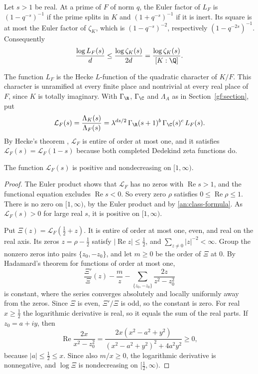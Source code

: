 Let $s>1$ be real. At a prime of $F$ of norm $q$, the Euler factor of $L_F$
is $(1-q^{-s})^{-1}$ if the prime splits in $K$ and $(1+q^{-s})^{-1}$ if it
is inert. Its square is at most the Euler factor of $\zeta_K$, which is
$(1-q^{-s})^{-2}$, respectively $(1-q^{-2s})^{-1}$. Consequently
\begin{equation}\label{an:relative-euler}
 \frac{\log L_F(s)}d\le\frac{\log\zeta_K(s)}{2d}
 =\frac{\log\zeta_K(s)}{[K:\Q]}.
\end{equation}

The function $L_F$ is the Hecke $L$-function of the quadratic character of
$K/F$. This character is unramified at every finite place and nontrivial at
every real place of $F$, since $K$ is totally imaginary. With $\Gamma_\R$,
$\Gamma_\C$ and $\Lambda_A$ as in Section~\ref{gf:section}, put
\begin{equation}\label{an:completion}
 \mathcal L_F(s)=\frac{\Lambda_K(s)}{\Lambda_F(s)}
 =\lambda^{ds/2}\,\Gamma_\R(s+1)^b\,\Gamma_\C(s)^c\,L_F(s).
\end{equation}
By Hecke's theorem \cite{Hecke1920,Tate1967}, $\mathcal L_F$ is entire of
order at most one, and it satisfies $\mathcal L_F(s)=\mathcal L_F(1-s)$
because both completed Dedekind zeta functions do.

\begin{lemma}\label{an:monotonicity}
The function $\mathcal L_F(s)$ is positive and nondecreasing on $[1,\infty)$.
\end{lemma}

\begin{proof}
The Euler product shows that $\mathcal L_F$ has no zeros with
$\operatorname{Re}s>1$, and the functional equation excludes
$\operatorname{Re}s<0$. So every zero $\rho$ satisfies $0\le\operatorname{Re}
\rho\le1$. There is no zero on $[1,\infty)$, by the Euler product and by
\eqref{an:class-formula}. As $\mathcal L_F(s)>0$ for large real $s$,
it is positive on $[1,\infty)$.

Put $\Xi(z)=\mathcal L_F(\frac12+z)$. It is entire of order at most one,
even, and real on the real axis. Its zeros $z=\rho-\frac12$ satisfy
$|\operatorname{Re}z|\le\frac12$, and $\sum_{z\ne0}|z|^{-2}<\infty$. Group
the nonzero zeros into pairs $\{z_0,-z_0\}$, and let $m\ge0$ be the order of
$\Xi$ at $0$. By Hadamard's theorem for functions of order at most one,
\[
 \frac{\Xi'}{\Xi}(z)-\frac mz-\sum_{\{z_0,-z_0\}}\frac{2z}{z^2-z_0^2}
\]
is constant, where the series converges absolutely and locally uniformly
away from the zeros. Since $\Xi$ is even, $\Xi'/\Xi$ is odd, so the constant
is zero. For real $x\ge\frac12$ the logarithmic derivative is real, so it
equals the sum of the real parts. If $z_0=a+iy$, then
\[
 \operatorname{Re}\frac{2x}{x^2-z_0^2}
 =\frac{2x(x^2-a^2+y^2)}{(x^2-a^2+y^2)^2+4a^2y^2}\ge0,
\]
because $|a|\le\frac12\le x$. Since also $m/x\ge0$, the logarithmic
derivative is nonnegative, and $\log\Xi$ is nondecreasing on
$[\frac12,\infty)$.
\end{proof}

